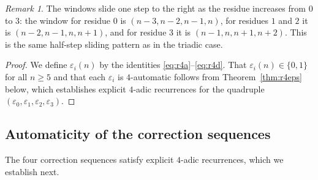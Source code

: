 \documentclass[12pt]{article}
\theoremstyle{definition}
\theoremstyle{remark}
\newtheorem{remark}[theorem]{Remark}
\begin{document}
\begin{remark}
  The windows slide one step to the right as the residue increases from $0$ to $3$:
  the window for residue $0$ is $(n-3,n-2,n-1,n)$, for residues $1$ and $2$ it is
  $(n-2,n-1,n,n+1)$, and for residue $3$ it is $(n-1,n,n+1,n+2)$.
  This is the same half-step sliding pattern as in the triadic case.
\end{remark}

\begin{proof}
  We define $\varepsilon_i(n)$ by the identities
  \eqref{eq:r4a}--\eqref{eq:r4d}.
  That $\varepsilon_i(n)\in\{0,1\}$ for all $n\ge 5$ and that each $\varepsilon_i$
  is $4$-automatic follows from Theorem~\ref{thm:r4eps} below, which
  establishes explicit $4$-adic recurrences for the quadruple
  $(\varepsilon_0,\varepsilon_1,\varepsilon_2,\varepsilon_3)$.
\end{proof}

\subsection{Automaticity of the correction sequences}

The four correction sequences satisfy explicit $4$-adic recurrences, which we establish next.
\end{document}
